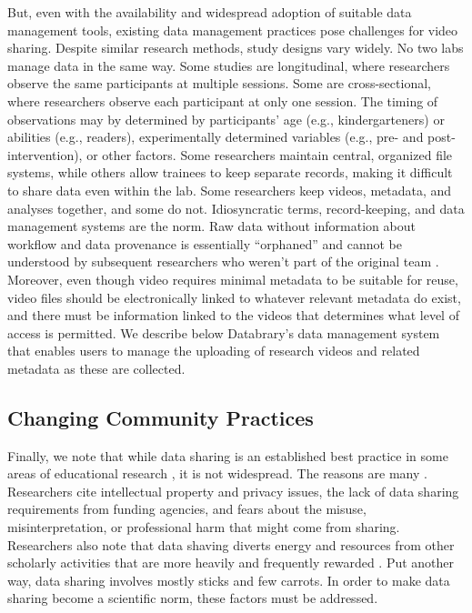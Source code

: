 \documentclass[letterpaper,man,apacite]{apa6}
\begin{document}
But, even with the availability and widespread adoption of suitable data management tools, existing data management practices pose challenges for video sharing.
Despite similar research methods, study designs vary widely. 
No two labs manage data in the same way. 
Some studies are longitudinal, where researchers observe the same participants at multiple sessions. 
Some are cross-sectional, where researchers observe each participant at only one session. 
The timing of observations may by determined by participants’ age (e.g., kindergarteners) or abilities (e.g., readers), experimentally determined variables (e.g., pre- and post-intervention), or other factors. 
Some researchers maintain central, organized file systems, while others allow trainees to keep separate records, making it difficult to share data even within the lab. 
Some researchers keep videos, metadata, and analyses together, and some do not. 
Idiosyncratic terms, record-keeping, and data management systems are the norm. 
Raw data without information about workflow and data provenance is essentially “orphaned” and cannot be understood by subsequent researchers who weren’t part of the original team \cite{curry2011}. 
Moreover, even though video requires minimal metadata to be suitable for reuse, video files should be electronically linked to whatever relevant metadata do exist, and there must be information linked to the videos that determines what level of access is permitted. 
We describe below Databrary's data management system that enables users to manage the uploading of research videos and related metadata as these are collected.

\subsection{Changing Community Practices}

Finally, we note that while data sharing is an established best practice in some areas of educational research \cite{AERA-Code-2011}, it is not widespread.
The reasons are many \cite{Ascoli2006b,Ferguson2014}.
Researchers cite intellectual property and privacy issues, the lack of data sharing requirements from funding agencies, and fears about the misuse, misinterpretation, or professional harm that might come from sharing.
Researchers also note that data shaving diverts energy and resources from other scholarly activities that are more heavily and frequently rewarded \cite{Ascoli2006b,Ferguson2014}.
Put another way, data sharing involves mostly sticks and few carrots.
In order to make data sharing become a scientific norm, these factors must be addressed.
\end{document}
